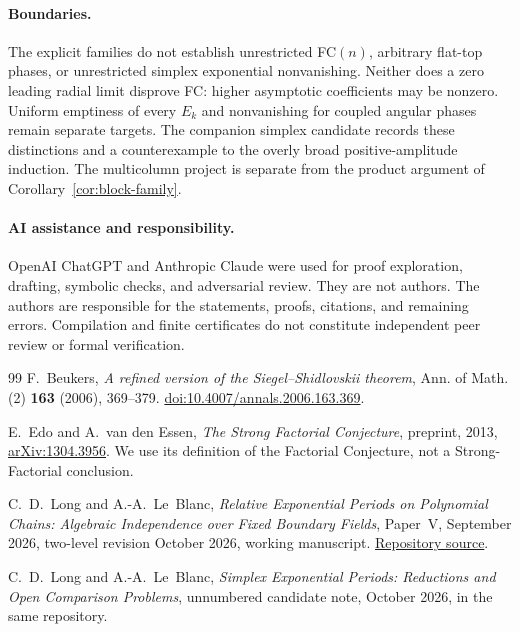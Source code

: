 \documentclass[11pt]{article}
\numberwithin{equation}{section}
\theoremstyle{definition}
\theoremstyle{remark}
\begin{document}
\paragraph{Boundaries.}
The explicit families do not establish unrestricted FC$(n)$, arbitrary
flat-top phases, or unrestricted simplex exponential nonvanishing. Neither
does a zero leading radial limit disprove FC: higher asymptotic coefficients
may be nonzero. Uniform emptiness of every $E_k$ and nonvanishing for coupled
angular phases remain separate targets. The companion simplex candidate
\cite{SimplexCandidate} records these distinctions and a counterexample to
the overly broad positive-amplitude induction. The multicolumn project is
separate from the product argument of Corollary~\ref{cor:block-family}.

\paragraph{AI assistance and responsibility.}
OpenAI ChatGPT and Anthropic Claude were used for proof exploration,
drafting, symbolic checks, and adversarial review. They are not authors.
The authors are responsible for the statements, proofs, citations, and
remaining errors. Compilation and finite certificates do not constitute
independent peer review or formal verification.

\small
\begin{thebibliography}{99}
 F.~Beukers,
\emph{A refined version of the Siegel--Shidlovskii theorem},
Ann. of Math. (2) \textbf{163} (2006), 369--379.
\href{https://doi.org/10.4007/annals.2006.163.369}{doi:10.4007/annals.2006.163.369}.

 E.~Edo and A.~van den Essen,
\emph{The Strong Factorial Conjecture},
preprint, 2013, \href{https://arxiv.org/abs/1304.3956}{arXiv:1304.3956}.
We use its definition of the Factorial Conjecture, not a Strong-Factorial
conclusion.

 C.~D.~Long and A.-A.~Le~Blanc,
\emph{Relative Exponential Periods on Polynomial Chains:
Algebraic Independence over Fixed Boundary Fields}, Paper~V,
September 2026, two-level revision October 2026, working manuscript.
\href{https://github.com/long-mathematics/exponential-integral-theorem/blob/main/papers/05-polynomial-flags/polynomial-flag-exponential-periods.tex}{Repository source}.

 C.~D.~Long and A.-A.~Le~Blanc,
\emph{Simplex Exponential Periods: Reductions and Open Comparison Problems},
unnumbered candidate note, October 2026, in the same repository.
\end{thebibliography}
\end{document}
